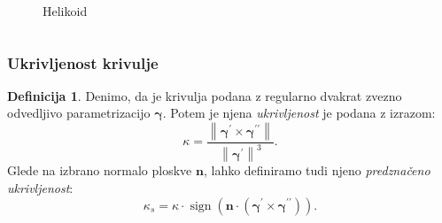 \documentclass[10pt]{beamer}
\theoremstyle{definition}
\newtheorem{definicija}{Definicija}
\theoremstyle{remark}
\theoremstyle{plain}
\numberwithin{equation}{section}  %
\begin{document}
\begin{frame}
\begin{columns}[b]
\begin{column}{0.45\textwidth}
\begin{figure}[H]
            
                \caption{Helikoid}
                \label{fig:2}
            \end{figure}
        \end{column}
    \end{columns}

\end{frame}

\begin{frame}
    \frametitle{Ukrivljenost krivulje}

    \begin{definicija}
        Denimo, da je krivulja podana z regularno dvakrat zvezno odvedljivo parametrizacijo $\boldsymbol{\gamma}$. Potem je njena \emph{ukrivljenost} je podana z izrazom: 
        $$
        \kappa=\frac{\left\|\boldsymbol{\gamma}^{\prime} \times \boldsymbol{\gamma}^{\prime \prime}\right\|}{\left\|\boldsymbol{\gamma}^{\prime}\right\|^3}.
        $$
        Glede na izbrano normalo ploskve $\mathbf{n}$, lahko definiramo tudi njeno \emph{predznačeno ukrivljenost}:
        $$
        \kappa_s=\kappa \cdot \operatorname{sign}\left(\mathbf{n} \cdot\left(\boldsymbol{\gamma}^{\prime} \times \boldsymbol{\gamma}^{\prime \prime}\right)\right).
        $$
    \end{definicija}

\end{frame}
\end{document}

